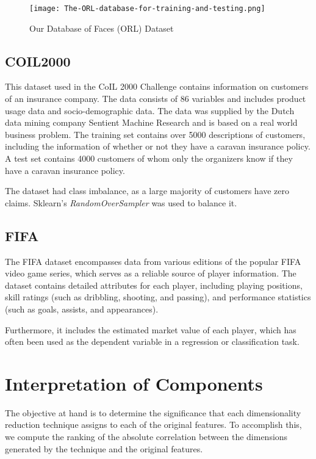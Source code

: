 \begin{figure}
    \centering
    \texttt{[image: The-ORL-database-for-training-and-testing.png]}
    \caption{Our Database of Faces (ORL) Dataset}
    \label{fig:orl_faces}
\end{figure}

\subsection{COIL2000}
This dataset used in the CoIL 2000 Challenge contains information on customers of an insurance company. The data consists of 86 variables and includes product usage data and socio-demographic data. The data was supplied by the Dutch data mining company Sentient Machine Research and is based on a real world business problem. The training set contains over 5000 descriptions of customers, including the information of whether or not they have a caravan insurance policy. A test set contains 4000 customers of whom only the organizers know if they have a caravan insurance policy.

The dataset had class imbalance, as a large majority of customers have zero claims. Sklearn's \textit{RandomOverSampler} was used to balance it.

\subsection{FIFA}
The FIFA dataset encompasses data from various editions of the popular FIFA video game series, which serves as a reliable source of player information. The dataset contains detailed attributes for each player, including playing positions, skill ratings (such as dribbling, shooting, and passing), and performance statistics (such as goals, assists, and appearances).

Furthermore, it includes the estimated market value of each player, which has often been used as the dependent variable in a regression or classification task.

\section{Interpretation of Components}

The objective at hand is to determine the significance that each dimensionality reduction technique assigns to each of the original features. To accomplish this, we compute the ranking of the absolute correlation between the dimensions generated by the technique and the original features.

